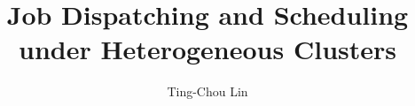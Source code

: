 \documentclass{beamer}
\title{Job Dispatching and Scheduling under Heterogeneous Clusters}
\author{Ting-Chou Lin}
\begin{document}
\begin{frame}
  \titlepage
  \label{title-page}
\end{frame}








\end{document}
